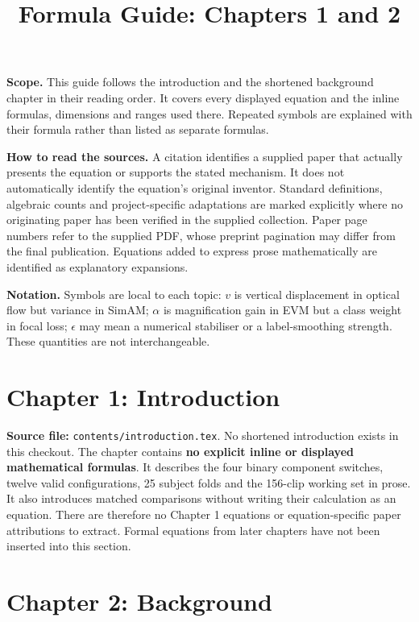 \documentclass[11pt,a4paper]{article}
\title{Formula Guide: Chapters 1 and 2}
\author{}
\date{}
\numberwithin{equation}{section}
\begin{document}
\maketitle

\textbf{Scope.} This guide follows the introduction and the shortened background
chapter in their reading order. It covers every displayed equation and the
inline formulas, dimensions and ranges used there. Repeated symbols are
explained with their formula rather than listed as separate formulas.

\textbf{How to read the sources.} A citation identifies a supplied paper that
actually presents the equation or supports the stated mechanism. It does not
automatically identify the equation's original inventor. Standard definitions,
algebraic counts and project-specific adaptations are marked explicitly where
no originating paper has been verified in the supplied collection. Paper page
numbers refer to the supplied PDF, whose preprint pagination may differ from
the final publication. Equations added to express prose mathematically are
identified as explanatory expansions.

\textbf{Notation.} Symbols are local to each topic: $v$ is vertical displacement
in optical flow but variance in SimAM; $\alpha$ is magnification gain in EVM but
a class weight in focal loss; $\epsilon$ may mean a numerical stabiliser or a
label-smoothing strength. These quantities are not interchangeable.

\tableofcontents
\clearpage

\section{Chapter 1: Introduction}
\label{fg:chapter1}

\textbf{Source file:} \texttt{contents/introduction.tex}. No shortened
introduction exists in this checkout. The chapter contains \textbf{no explicit
inline or displayed mathematical formulas}. It describes the four binary
component switches, twelve valid configurations, 25 subject folds and the
156-clip working set in prose. It also introduces matched comparisons without
writing their calculation as an equation. There are therefore no Chapter 1
equations or equation-specific paper attributions to extract. Formal equations
from later chapters have not been inserted into this section.

\section{Chapter 2: Background}
\label{fg:chapter2}
\end{document}
